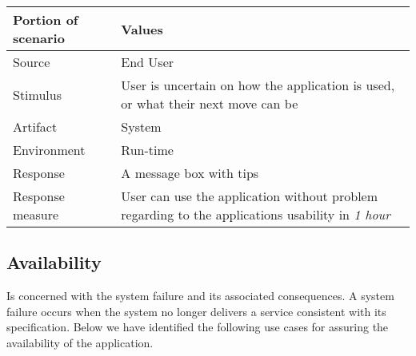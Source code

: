 \begin{itemize}
        \begin{tabular}{| l | p{7cm} |}
            \hline
            \rowcolor[gray]{0.8}
            \textbf{Portion of scenario} & \textbf{Values} \\
            \hline
            Source & End User \\
            Stimulus & User is uncertain on how the application is used, or what their next move can be \\
            Artifact & System \\
            Environment & Run-time \\
            Response & A message box with tips \\
            Response measure  & User can use the application without problem regarding to the applications usability in \emph{1 hour}\\
            \hline
        \end{tabular}
\end{itemize}

\subsection{Availability}
Is concerned with the system failure and its associated consequences. A system failure occurs when the system no longer delivers a service consistent with its specification\citep{ProgarkPensum}. Below we have identified the following use cases for assuring the availability of the application.

